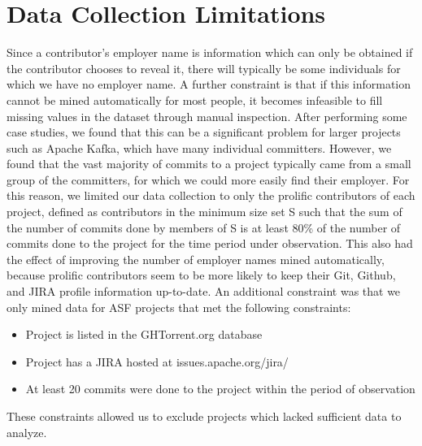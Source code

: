 \section{Data Collection Limitations}
Since a contributor’s employer name is information which can only be obtained if the contributor chooses to reveal it, there will typically be some individuals for which we have no employer name. A further constraint is that if this information cannot be mined automatically for most people, it becomes infeasible to fill missing values in the dataset through manual inspection. After performing some case studies, we found that this can be a significant problem for larger projects such as Apache Kafka, which have many individual committers. However, we found that the vast majority of commits to a project typically came from a small group of the committers, for which we could more easily find their employer. For this reason, we limited our data collection to only the prolific contributors of each project, defined as contributors in the minimum size set S such that the sum of the number of commits done by members of S is at least 80\% of the number of commits done to the project for the time period under observation. This also had the effect of improving the number of employer names mined automatically, because prolific contributors seem to be more likely to keep their Git, Github, and JIRA profile information up-to-date.
An additional constraint was that we only mined data for ASF projects that met the following constraints:
\begin{itemize}
	\item Project is listed in the GHTorrent.org database
	\item Project has a JIRA hosted at issues.apache.org/jira/
	\item At least 20 commits were done to the project within the period of observation
\end{itemize}
These constraints allowed us to exclude projects which lacked sufficient data to analyze.
